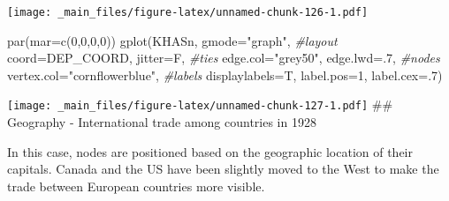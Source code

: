 \documentclass[
  notitlepage,
  onecolumn,
  openany]{book}
\newenvironment{Shaded}{\begin{snugshade}}{\end{snugshade}}
\newcommand{\AttributeTok}[1]{\textcolor[rgb]{0.77,0.63,0.00}{#1}}
\newcommand{\CommentTok}[1]{\textcolor[rgb]{0.56,0.35,0.01}{\textit{#1}}}
\newcommand{\DecValTok}[1]{\textcolor[rgb]{0.00,0.00,0.81}{#1}}
\newcommand{\FunctionTok}[1]{\textcolor[rgb]{0.00,0.00,0.00}{#1}}
\newcommand{\NormalTok}[1]{#1}
\newcommand{\StringTok}[1]{\textcolor[rgb]{0.31,0.60,0.02}{#1}}
\begin{document}
\texttt{[image: \_main\_files/figure-latex/unnamed-chunk-126-1.pdf]}

\begin{Shaded}
\begin{Highlighting}[]
\FunctionTok{par}\NormalTok{(}\AttributeTok{mar=}\FunctionTok{c}\NormalTok{(}\DecValTok{0}\NormalTok{,}\DecValTok{0}\NormalTok{,}\DecValTok{0}\NormalTok{,}\DecValTok{0}\NormalTok{))}
\FunctionTok{gplot}\NormalTok{(KHASn,}
      \AttributeTok{gmode=}\StringTok{"graph"}\NormalTok{,}
      \CommentTok{\#layout}
      \AttributeTok{coord=}\NormalTok{DEP\_COORD,}
      \AttributeTok{jitter=}\NormalTok{F,}
      \CommentTok{\#ties}
      \AttributeTok{edge.col=}\StringTok{"grey50"}\NormalTok{,}
      \AttributeTok{edge.lwd=}\NormalTok{.}\DecValTok{7}\NormalTok{,}
      \CommentTok{\#nodes}
      \AttributeTok{vertex.col=}\StringTok{"cornflowerblue"}\NormalTok{,}
      \CommentTok{\#labels}
      \AttributeTok{displaylabels=}\NormalTok{T, }
      \AttributeTok{label.pos=}\DecValTok{1}\NormalTok{, }
      \AttributeTok{label.cex=}\NormalTok{.}\DecValTok{7}\NormalTok{)}
\end{Highlighting}
\end{Shaded}

\texttt{[image: \_main\_files/figure-latex/unnamed-chunk-127-1.pdf]}
\#\# Geography - International trade among countries in 1928

In this case, nodes are positioned based on the geographic location of their capitals. Canada and the US have been slightly moved to the West to make the trade between European countries more visible.
\end{document}
